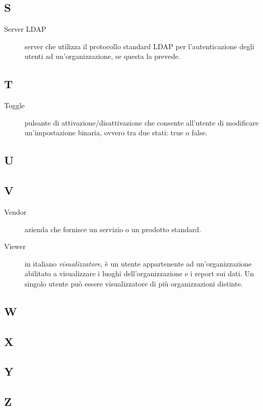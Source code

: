 \documentclass[../../../analisi-dei-requisiti.tex]{subfiles}
\begin{document}
\subsection{S}
\begin{description}
    \item[Server LDAP] server che utilizza il protocollo standard LDAP per l'autenticazione degli utenti ad un'organizzazione, se questa la prevede.
\end{description}

\subsection{T}
\begin{description}
  \item[Toggle] pulsante di attivazione/disattivazione che consente all'utente di modificare un'impostazione binaria, ovvero tra due stati: true o false.
\end{description}

\subsection{U}

\subsection{V}
\begin{description}
    \item[Vendor] azienda che fornisce un servizio o un prodotto standard.
    \item[Viewer] in italiano \textit{visualizzatore}, è un utente appartenente ad un'organizzazione abilitato a visualizzare i luoghi dell'organizzazione e i report sui dati. Un singolo utente può essere visualizzatore di più organizzazioni distinte.
\end{description}

\subsection{W}

\subsection{X}

\subsection{Y}

\subsection{Z}
\end{document}

